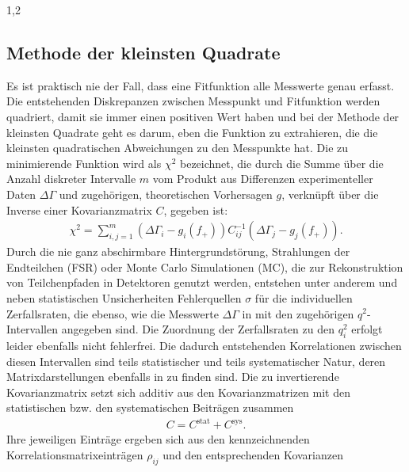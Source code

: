 \documentclass[11pt,a4paper,twoside,draft]{report}
\begin{document}
\begin{spacing}{1,2}
\subsection{Methode der kleinsten Quadrate}
Es ist praktisch nie der Fall, dass eine Fitfunktion alle Messwerte genau erfasst. Die entstehenden Diskrepanzen zwischen Messpunkt und Fitfunktion werden
quadriert, damit sie immer einen positiven Wert haben und bei der Methode der kleinsten Quadrate geht es darum, eben die Funktion zu extrahieren, die die 
kleinsten quadratischen Abweichungen zu den Messpunkte hat. Die zu minimierende Funktion wird als $\chi^2$ bezeichnet, die durch die Summe über die Anzahl diskreter 
Intervalle $m$ vom Produkt aus Differenzen experimenteller Daten $\Delta \Gamma$ und zugehörigen, theoretischen Vorhersagen $g$, verknüpft über die 
Inverse einer Kovarianzmatrix $C$, gegeben ist:
\begin{align}
 \chi^2 = \sum\limits_{i,j=1}^m (\Delta \Gamma_i - g_i(f_+))C^{-1}_{ij}(\Delta \Gamma_j - g_j(f_+)).
 \label{eq_chi2}
\end{align}
Durch die nie ganz abschirmbare Hintergrundstörung, Strahlungen der Endteilchen (FSR) oder Monte Carlo Simulationen (MC), die zur Rekonstruktion von 
Teilchenpfaden in Detektoren genutzt werden, entstehen unter anderem und neben statistischen Unsicherheiten Fehlerquellen $\sigma$ für die individuellen Zerfallsraten, die ebenso, wie die Messwerte 
 $\Delta \Gamma$ in \cite{PhysRev_Data} mit den zugehörigen $q^2$-Intervallen angegeben sind. Die 
Zuordnung der Zerfallsraten zu den $q^2_i$ erfolgt leider ebenfalls nicht fehlerfrei. Die dadurch entstehenden Korrelationen zwischen diesen Intervallen 
sind teils statistischer und teils systematischer Natur, deren Matrixdarstellungen ebenfalls in \cite{PhysRev_Data} zu finden 
sind. Die zu invertierende Kovarianzmatrix setzt sich additiv aus den Kovarianzmatrizen mit den statistischen bzw. den systematischen Beiträgen zusammen
\begin{align}
 C = C^{\text{stat}} + C^{\text{sys}}.
\end{align}
Ihre jeweiligen Einträge ergeben sich aus den kennzeichnenden Korrelationsmatrixeinträgen $\rho_{ij}$ und den entsprechenden Kovarianzen

\end{spacing}
\end{document}
